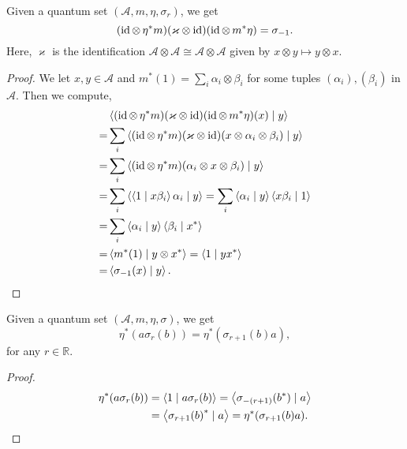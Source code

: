  \begin{proposition}\label{modAut_neg_one_eq_right_twist}
  \leanok
  Given a quantum set $(\mathcal{A},m,\eta,\sigma_r)$, we get
  \[(\operatorname{id}\otimes\,\eta^*m)(\varkappa\otimes\operatorname{id})(\operatorname{id}\otimes\,m^*\eta)=\sigma_{-1}.\]
  Here, $\varkappa$ is the identification $\mathcal{A}\otimes\mathcal{A}\cong\mathcal{A}\otimes\mathcal{A}$ given by $x\otimes y\mapsto y\otimes x$.
 \end{proposition}
 \begin{proof}\leanok
  We let $x,y\in\mathcal{A}$ and $m^*(1)=\sum_i\alpha_i\otimes\beta_i$ for some tuples $(\alpha_i),(\beta_i)$ in $\mathcal{A}$. Then we compute,
  \begin{align*}
   & \left\langle(\operatorname{id}\otimes\,\eta^*m)(\varkappa\otimes\operatorname{id})(\operatorname{id}\otimes\,m^*\eta)(x) \mid y\right\rangle\\
   =& \sum_i\left\langle(\operatorname{id}\otimes\,\eta^*m)(\varkappa\otimes\operatorname{id})(x\otimes\alpha_i\otimes\beta_i) \mid y\right\rangle\\
   =& \sum_i\left\langle(\operatorname{id}\otimes\,\eta^*m)(\alpha_i\otimes x\otimes\beta_i) \mid y\right\rangle\\
   =& \sum_i\left\langle\left\langle1 \mid x\beta_i\right\rangle\alpha_i \mid y\right\rangle = \sum_i\left\langle\alpha_i \mid y\right\rangle\left\langle x\beta_i \mid 1\right\rangle\\
   =& \sum_i\left\langle\alpha_i \mid y\right\rangle\left\langle\beta_i \mid x^*\right\rangle\\
   =& \left\langle m^*(1) \mid y\otimes x^*\right\rangle=\left\langle1 \mid yx^*\right\rangle\\
   =& \left\langle\sigma_{-1}(x) \mid y\right\rangle.
  \end{align*}
 \end{proof}

 \begin{lemma}\label{counit_mul_modAut_symm'}
  \leanok
  Given a quantum set $(\mathcal{A},m,\eta,\sigma)$, we get
  \[\eta^*(a\sigma_r(b)) = \eta^*(\sigma_{r + 1}(b)a),\]
  for any $r\in\mathbb{R}$.
 \end{lemma}
 \begin{proof}\leanok
  \begin{align*}
   \eta^*(a\sigma_r(b)) &= \left\langle1 \mid a\sigma_r(b)\right\rangle = \left\langle\sigma_{-(r+1)}(b^*) \mid a\right\rangle\\
   &= \left\langle{\sigma_{r+1}(b)}^* \mid a\right\rangle=\eta^*(\sigma_{r+1}(b)a).
  \end{align*}
 \end{proof}

